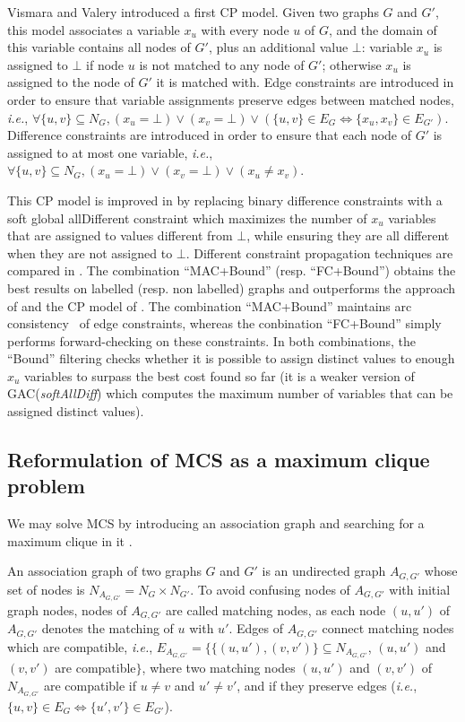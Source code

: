 \documentclass{llncs}
\begin{document}
Vismara and Valery  \cite{DBLP:conf/mco/VismaraV08} introduced a first CP model. Given two graphs $G$ and $G'$, this model associates a variable $x_u$ with every node $u$ of $G$, and the domain of this variable contains all nodes of $G'$, plus an additional value $\bot$: variable $x_u$ is assigned to $\bot$ if node $u$ is not matched to any node of $G'$; otherwise $x_u$ is assigned to the node of $G'$ it is matched with. Edge constraints are introduced in order to ensure that variable assignments preserve edges between matched nodes, {\em i.e.}, 
$\forall \{u,v\}\subseteq N_G, (x_u=\bot)\vee (x_v=\bot) \vee (\{u,v\}\in E_G\Leftrightarrow \{x_u,x_v\}\in E_{G'})$. Difference constraints are introduced in order to ensure that each node of $G'$ is assigned to at most one variable, {\em i.e.}, $\forall \{u,v\}\subseteq N_G, (x_u=\bot)\vee (x_v=\bot) \vee (x_u\neq x_v)$.

This CP model is improved in \cite{DBLP:conf/cp/NdiayeS11} by replacing binary difference constraints with a soft global allDifferent constraint which maximizes the number of $x_u$ variables that are assigned to values different from $\bot$, while ensuring they are all different when they are not assigned to $\bot$.
Different constraint propagation techniques are compared in \cite{DBLP:conf/cp/NdiayeS11}. The combination ``MAC+Bound'' (resp. ``FC+Bound'') obtains the best results on labelled (resp. non labelled) graphs and outperforms the approach of \cite{McGreg82} and the CP model of \cite{DBLP:conf/mco/VismaraV08}. The combination ``MAC+Bound'' maintains arc consistency~\cite{sabi94} of edge constraints, whereas the conbination ``FC+Bound'' simply performs forward-checking on these constraints. In both combinations, the ``Bound'' filtering checks whether it is possible to assign distinct values to enough $x_u$ variables to surpass the best cost found so far (it is a weaker version of GAC(\emph{softAllDiff}) \cite{peti01} which computes the maximum number of variables that can be assigned distinct values).



\subsection{Reformulation of MCS as a maximum clique problem}
\label{clique}

We may solve MCS by introducing an association graph and searching for a maximum clique in it \cite{bala86,dura99,DBLP:journals/jcamd/RaymondW02a}.

An association graph of two graphs $G$ and $G'$ is an undirected graph $A_{G,G'}$ whose set of nodes is $N_{A_{G,G'}} = N_G \times N_{G'}$. To avoid confusing nodes of $A_{G,G'}$ with initial graph nodes, nodes of $A_{G,G'}$ are called matching nodes, as each node $(u,u')$ of $A_{G,G'}$ denotes the matching of $u$ with $u'$. Edges of $A_{G,G'}$ connect matching nodes which are compatible, {\em i.e.}, $E_{A_{G,G'}} = \big\{\{(u,u'),(v,v')\}\subseteq N_{A_{G,G'}}$, $(u,u')$ and $(v,v')$ are compatible$\big\}$, where two matching nodes $(u,u')$ and $(v,v')$ of $N_{A_{G,G'}}$ are compatible if $u \neq v$ and $u' \neq v'$, and if they preserve edges (\emph{i.e.}, $\{u,v\} \in E_G \Leftrightarrow \{u',v'\} \in E_{G'}$).
\end{document}
